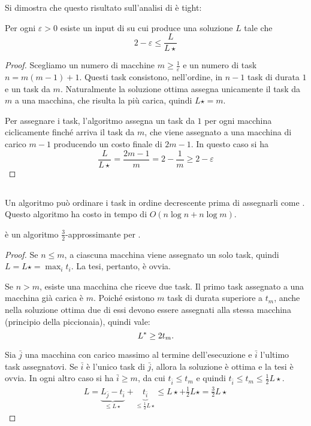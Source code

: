 Si dimostra che questo risultato sull'analisi di \GreedyLoadBalancing è tight:
\begin{theorem}
	Per ogni $\varepsilon>0$ esiste un input di \LoadBalancing su cui \GreedyLoadBalancing produce una soluzione $L$ tale che
	\begin{equation*}
		2-\varepsilon\leq\frac L{L\star}
	\end{equation*}
\end{theorem}
\begin{proof}
	Scegliamo un numero di macchine $m\geq\frac1\varepsilon$ e un numero di task $n=m(m-1)+1$. Questi task consistono, nell'ordine, in $n-1$ task di durata $1$ e un task da $m$. Naturalmente la soluzione ottima assegna unicamente il task da $m$ a una macchina, che risulta la più carica, quindi $L\star=m$.

	Per assegnare i task, l'algoritmo assegna un task da $1$ per ogni macchina ciclicamente finché arriva il task da $m$, che viene assegnato a una macchina di carico $m-1$ producendo un costo finale di $2m-1$. In questo caso si ha
	\begin{equation*}
		\frac L{L\star}=\frac{2m-1}{m}=2-\frac1m\geq2-\varepsilon
	\end{equation*}
\end{proof}


\subsection{\SortedGreedyBalance}
Un algoritmo \SortedGreedyBalance può ordinare i task in ordine decrescente prima di assegnarli come \GreedyLoadBalancing. Questo algoritmo ha costo in tempo di $O(n\log n+n\log m)$.

\begin{theorem}
	\SortedGreedyBalance è un algoritmo $\frac32$-approssimante per \LoadBalancing.
\end{theorem}
\begin{proof}
	Se $n\leq m$, a ciascuna macchina viene assegnato un solo task, quindi $L=L\star=\max_i t_i$. La tesi, pertanto, è ovvia.

	Se $n>m$, esiste una macchina che riceve due task.
	Il primo task assegnato a una macchina già carica è $m$.
	Poiché esistono $m$ task di durata superiore a $t_m$, anche nella soluzione ottima due di essi devono essere assegnati alla stessa macchina (principio della piccionaia), quindi vale:
	\begin{equation*}
		L\star\geq 2t_m \text.
	\end{equation*}

	Sia $\bar j$ una macchina con carico massimo al termine dell'esecuzione e $\bar i$ l'ultimo task assegnatovi.
	Se $\bar i$ è l'unico task di $\bar j$, allora la soluzione è ottima e la tesi è ovvia.
	In ogni altro caso si ha $\bar i \geq m$, da cui $t_{\bar i}\leq t_m$ e quindi $t_{\bar i}\leq t_m\leq \frac12 L\star$.
	\begin{gather*}
		L=\underbrace{L_{\bar j}-t_{\bar i}}_{\leq L\star}+\underbrace{t_{\bar i}}_{\leq \frac12 L\star}\leq L\star+\frac12 L\star=\frac32L\star
	\end{gather*}
\end{proof}

